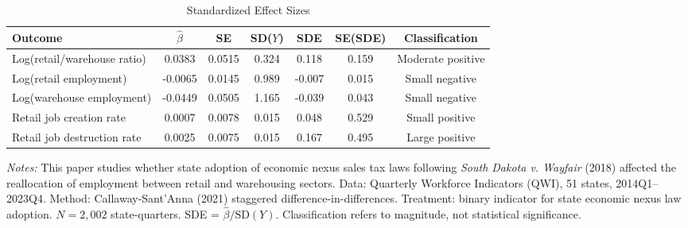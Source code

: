 \begin{table}[t]
\centering
\caption{Standardized Effect Sizes}
\label{tab:sde}
\begin{adjustbox}{max width=\textwidth}
\begin{tabular}{lcccccc}
\hline\hline
Outcome & $\hat{\beta}$ & SE & SD($Y$) & SDE & SE(SDE) & Classification \\
\hline
Log(retail/warehouse ratio) & 0.0383 & 0.0515 & 0.324 & 0.118 & 0.159 & Moderate positive \\
Log(retail employment) & -0.0065 & 0.0145 & 0.989 & -0.007 & 0.015 & Small negative \\
Log(warehouse employment) & -0.0449 & 0.0505 & 1.165 & -0.039 & 0.043 & Small negative \\
Retail job creation rate & 0.0007 & 0.0078 & 0.015 & 0.048 & 0.529 & Small positive \\
Retail job destruction rate & 0.0025 & 0.0075 & 0.015 & 0.167 & 0.495 & Large positive \\
\hline\hline
\end{tabular}
\end{adjustbox}
\begin{tablenotes}
\small
\item \textit{Notes:} This paper studies whether state adoption of economic nexus sales tax laws following \textit{South Dakota v. Wayfair} (2018) affected the reallocation of employment between retail and warehousing sectors. Data: Quarterly Workforce Indicators (QWI), 51 states, 2014Q1--2023Q4. Method: Callaway-Sant'Anna (2021) staggered difference-in-differences. Treatment: binary indicator for state economic nexus law adoption. $N = 2,002$ state-quarters. SDE = $\hat{\beta} / \text{SD}(Y)$. Classification refers to magnitude, not statistical significance.
\end{tablenotes}
\end{table}
